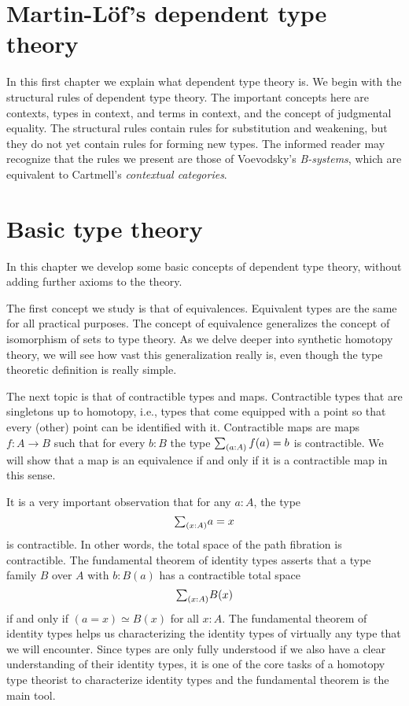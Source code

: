 \documentclass[10pt]{memoir} %
\begin{document}
\mainmatter

\renewcommand{\thechapter}{\Roman{chapter}}

\chapter{Martin-L\"of's dependent type theory}

In this first chapter we explain what dependent type theory is. We begin with the structural rules of dependent type theory. The important concepts here are contexts, types in context, and terms in context, and the concept of judgmental equality. The structural rules contain rules for substitution and weakening, but they do not yet contain rules for forming new types. The informed reader may recognize that the rules we present are those of Voevodsky's \emph{B-systems}, which are equivalent to Cartmell's \emph{contextual categories}.







\chapter{Basic type theory}

In this chapter we develop some basic concepts of dependent type theory, without adding further axioms to the theory.

The first concept we study is that of equivalences. Equivalent types are the same for all practical purposes. The concept of equivalence generalizes the concept of isomorphism of sets to type theory. As we delve deeper into synthetic homotopy theory, we will see how vast this generalization really is, even though the type theoretic definition is really simple.

The next topic is that of contractible types and maps. Contractible types that are singletons up to homotopy, i.e., types that come equipped with a point so that every (other) point can be identified with it. Contractible maps are maps $f:A\to B$ such that for every $b:B$ the type $\sm{a:A}f(a)=b$ is contractible. We will show that a map is an equivalence if and only if it is a contractible map in this sense.

It is a very important observation that for any $a:A$, the type
\begin{equation*}
  \sm{x:A}a=x  
\end{equation*}
is contractible. In other words, the total space of the path fibration is contractible. The fundamental theorem of identity types asserts that a type family $B$ over $A$ with $b:B(a)$ has a contractible total space
\begin{equation*}
  \sm{x:A}B(x)
\end{equation*}
if and only if $(a=x)\simeq B(x)$ for all $x:A$. The fundamental theorem of identity types helps us characterizing the identity types of virtually any type that we will encounter. Since types are only fully understood if we also have a clear understanding of their identity types, it is one of the core tasks of a homotopy type theorist to characterize identity types and the fundamental theorem is the main tool.
\end{document}

